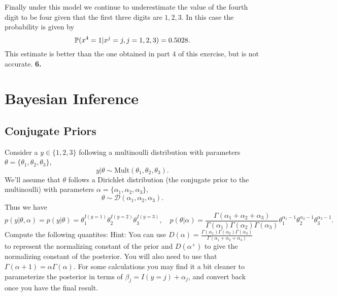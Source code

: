 \documentclass{article}
\begin{document}
Finally under this model we continue to underestimate the value of the fourth digit to be four given that the first three digits are $1,2,3$. In this
case the probability is given by
\begin{equation*}
\mathbb{P}(x^{4}=1|x^{j}=j,j=1,2,3)=0.5028.
\end{equation*}
This estimate is better than the one obtained in part $4$ of this exercise, but is not accurate.
\newline
\newline
\textbf{6.}
\newline



\newpage

\section{Bayesian Inference}

\subsection{Conjugate Priors}

Consider a $y \in \{1,2,3\}$ following a multinoulli distribution with parameters $\theta = \{\theta_1,\theta_2,\theta_3\}$,
\[
y | \theta \sim \text{Mult}(\theta_1,\theta_2,\theta_3).
\]
We'll assume that $\theta$ follows a Dirichlet distribution (the conjugate prior to the multinoulli) with parameters $\alpha = \{\alpha_1,\alpha_2,\alpha_3\}$,
\[
 \theta \sim \mathcal{D}(\alpha_1,\alpha_2,\alpha_3).
\]
Thus we have
\[
p(y|\theta,\alpha) = p(y|\theta) = \theta_1^{I(y=1)}\theta_2^{I(y=2)}\theta_3^{I(y=3)}, \quad p(\theta|\alpha) = \frac{\Gamma(\alpha_1+\alpha_2+\alpha_3)}{\Gamma(\alpha_1)\Gamma(\alpha_2)\Gamma(\alpha_3)}\theta_1^{\alpha_1-1}\theta_2^{\alpha_2-1}\theta_3^{\alpha_3-1}.
\]
Compute the following quantites:
 Hint: You can use $D(\alpha) =  \frac{\Gamma(\alpha_1)\Gamma(\alpha_2)\Gamma(\alpha_3)}{\Gamma(\alpha_1+\alpha_2+\alpha_3)}$ to represent the normalizing constant of the prior and $D(\alpha^+)$ to give the normalizing constant of the posterior. You will also need to use that $\Gamma(\alpha+1) = \alpha\Gamma(\alpha)$. For some calculations you may find it a bit cleaner to parameterize the posterior in terms of $\beta_j = I(y=j) + \alpha_j$, and convert back once you have the final result.
\end{document}
